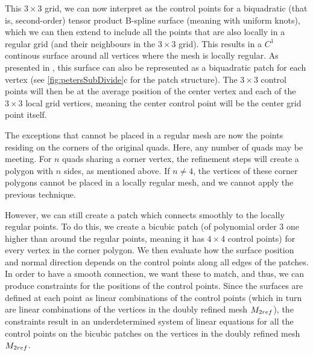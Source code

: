 This $3\times3$ grid, we can now interpret as the control points for a biquadratic (that is, second-order) tensor product B-spline surface (meaning with uniform knots), which we can then extend to include all the points that are also locally in a regular grid (and their neighbours in the $3\times3$ grid). This results in a $C^1$ continous surface around all vertices where the mesh is locally regular.
As presented in \cite{peters1992constructing}, this surface can also be represented as a biquadratic \Bez patch for each vertex (see \autoref{fig:petersSubDivide}c for the patch structure). The $3\times3$ \Bez control points will then be at the average position of the center vertex and each of the $3\times3$ local grid vertices, meaning the center \Bez control point will be the center grid point itself.


%

The exceptions that cannot be placed in a regular mesh are now the points residing on the corners of the original quads. 
Here, any number of quads may be meeting.
 For $n$ quads sharing a corner vertex, the refinement steps will create a polygon with $n$ sides, as mentioned above. If $n\neq4$, the vertices of these corner polygons cannot be placed in a locally regular mesh, and we cannot apply the previous technique. 

However, we can still create a \Bez patch which connects smoothly to the locally regular points. To do this, we create a bicubic \Bez patch (of polynomial order 3 one higher than around the regular points, meaning it has $4\times4$ control points) for every vertex in the corner polygon.
We then evaluate how the surface position and normal direction depends on the \Bez control points along all edges of the patches. In order to have a smooth connection, we want these to match, and thus, we can produce constraints for the positions of the \Bez control points.
Since the surfaces are defined at each point as linear combinations of the \Bez control points (which in turn are linear combinations of the vertices in the doubly refined mesh $\petersControlMeshDobRef$), the constraints result in an underdetermined system of linear equations for all the \Bez control points on the bicubic \Bez patches on the vertices in the doubly refined mesh $\petersControlMeshDobRef$.

